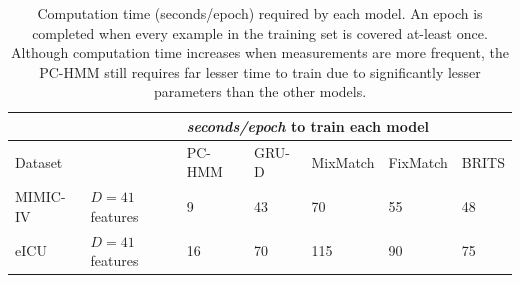 \begin{table}[H]
\centering
\begin{tabular}{|l|l|l|l|l|l|l|}
\hline
 & & \multicolumn{5}{l|}{\textit{seconds/epoch} to train each model} \\
\hline
    Dataset & & PC-HMM & GRU-D & MixMatch      & FixMatch      & BRITS     \\
\hline
MIMIC-IV & $D=41$ features & 9   & 43       & 70         & 55         &  48     \\
\hline
eICU    & $D=41$ features & 16        & 70       & 115         & 90   &  75     \\
\hline
\end{tabular}
  \caption[Computation time (seconds/epoch) required per model]{Computation time (seconds/epoch) required by each model. An epoch is completed when every example in the training set is covered at-least once. Although computation time increases when measurements are more frequent, the PC-HMM still requires far lesser time to train due to significantly lesser parameters than the other models.}
    \label{table: training_times}
\end{table}